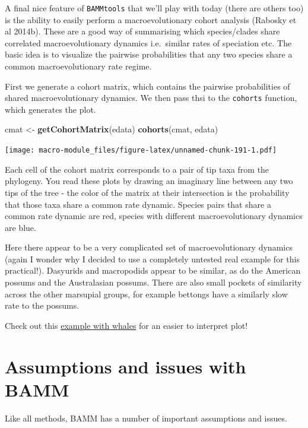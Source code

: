 \documentclass[]{book}
\newenvironment{Shaded}{\begin{snugshade}}{\end{snugshade}}
\newcommand{\KeywordTok}[1]{\textcolor[rgb]{0.13,0.29,0.53}{\textbf{{#1}}}}
\newcommand{\StringTok}[1]{\textcolor[rgb]{0.31,0.60,0.02}{{#1}}}
\newcommand{\NormalTok}[1]{{#1}}
\theoremstyle{definition}
\theoremstyle{definition}
\theoremstyle{definition}
\theoremstyle{remark}
\begin{document}
A final nice feature of \texttt{BAMMtools} that we'll play with today
(there are others too) is the ability to easily perform a
macroevolutionary cohort analysis (Rabosky et al 2014b). These are a
good way of summarising which species/clades share correlated
macroevolutionary dynamics i.e.~similar rates of speciation etc. The
basic idea is to visualize the pairwise probabilities that any two
species share a common macroevolutionary rate regime.

First we generate a cohort matrix, which contains the pairwise
probabilities of shared macroevolutionary dynamics. We then pass thsi to
the \texttt{cohorts} function, which generates the plot.

\begin{Shaded}
\begin{Highlighting}[]
\NormalTok{cmat <-}\StringTok{ }\KeywordTok{getCohortMatrix}\NormalTok{(edata)}
\KeywordTok{cohorts}\NormalTok{(cmat, edata)}
\end{Highlighting}
\end{Shaded}

\texttt{[image: macro-module\_files/figure-latex/unnamed-chunk-191-1.pdf]}

Each cell of the cohort matrix corresponds to a pair of tip taxa from
the phylogeny. You read these plots by drawing an imaginary line between
any two tips of the tree - the color of the matrix at their intersection
is the probability that those taxa share a common rate dynamic. Species
pairs that share a common rate dynamic are red, species with different
macroevolutionary dynamics are blue.

Here there appear to be a very complicated set of macroevolutionary
dynamics (again I wonder why I decided to use a completely untested real
example for this practical!). Dasyurids and macropodids appear to be
similar, as do the American possums and the Australasian possums. There
are also small pockets of similarity across the other marsupial groups,
for example bettongs have a similarly slow rate to the possums.

Check out this
\href{http://bamm-project.org/bammgraph.html\#whales-cohort}{example
with whales} for an easier to interpret plot!

\section{Assumptions and issues with
BAMM}\label{assumptions-and-issues-with-bamm}

Like all methods, BAMM has a number of important assumptions and issues.
\end{document}
